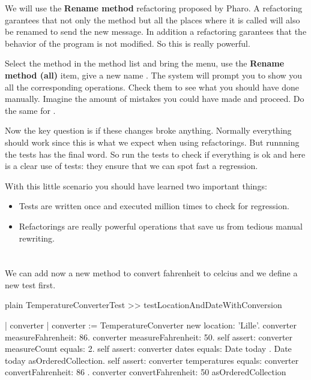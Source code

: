 \documentclass[10pt,twoside,english]{_support/latex/sbabook/sbabook}
\begin{document}
We will use the \textbf{Rename method} refactoring proposed by Pharo. A refactoring garantees that not only the method but all the places where it is called will also be renamed to send the new message. In addition a refactoring garantees that the behavior of the program is not modified.
So this is really powerful.

Select the method  in the method list and bring the menu, use the \textbf{Rename method (all)} item, give a new name . The system will prompt you to show you all the corresponding operations. Check them to see what you should have done manually. Imagine the amount of mistakes you could have made and proceed. Do the same for .

Now the key question is if these changes broke anything. Normally everything should work
since this is what we expect when using refactorings. But runnning the tests has the final word. So run the tests to check if everything is ok and here is a clear use of tests: they ensure that we can spot fast a regression.

With this little scenario you should have learned two important things:

\begin{itemize}
\item Tests are written once and executed million times to check for regression.
\item Refactorings are really powerful operations that save us from tedious manual rewriting.
\end{itemize}
\section{}
We can add now a new method to convert fahrenheit to celcius and we define a new test first.

\begin{displaycode}{plain}
TemperatureConverterTest >> testLocationAndDateWithConversion

    | converter |
    converter := TemperatureConverter new location: 'Lille'.
    converter measureFahrenheit: 86.
    converter measureFahrenheit: 50.
    self assert: converter measureCount equals: 2.
    self assert: converter dates
        equals: {Date today . Date today} asOrderedCollection.
    self assert: converter temperatures
        equals: { converter convertFahrenheit: 86 .
                converter convertFahrenheit: 50 } asOrderedCollection
\end{displaycode}
\end{document}
